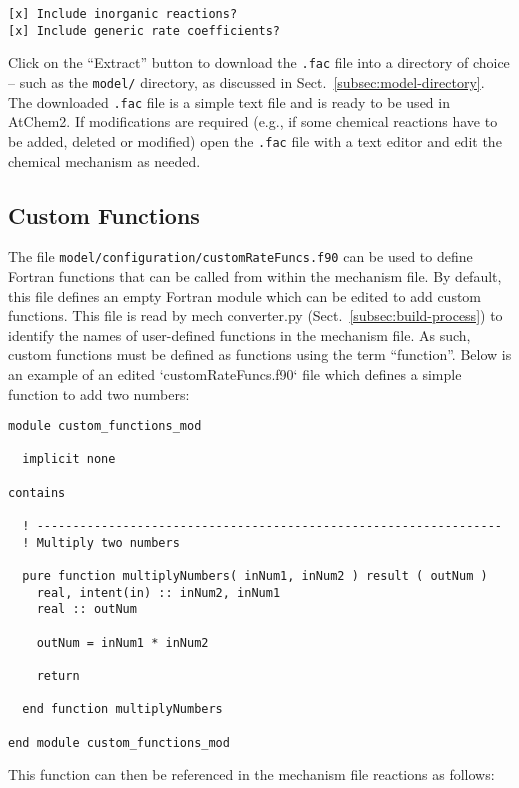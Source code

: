 \begin{verbatim}
[x] Include inorganic reactions?
[x] Include generic rate coefficients?
\end{verbatim}

Click on the ``Extract'' button to download the \texttt{.fac} file
into a directory of choice -- such as the \texttt{model/} directory,
as discussed in Sect.~\ref{subsec:model-directory}. The downloaded
\texttt{.fac} file is a simple text file and is ready to be used in
AtChem2. If modifications are required (e.g., if some chemical
reactions have to be added, deleted or modified) open the
\texttt{.fac} file with a text editor and edit the chemical mechanism
as needed.

\subsection{Custom Functions} \label{subsec:custom-functions}

The file \texttt{model/configuration/customRateFuncs.f90} can be used
to define Fortran functions that can be called from within the
mechanism file. By default, this file defines an empty Fortran module
which can be edited to add custom functions. This file is read by mech
converter.py (Sect.~\ref{subsec:build-process}) to identify the names
of user-defined functions in the mechanism file. As such, custom
functions must be defined as functions using the term
``function''. Below is an example of an edited `customRateFuncs.f90`
file which defines a simple function to add two numbers:

\begin{verbatim}
module custom_functions_mod

  implicit none

contains

  ! -----------------------------------------------------------------
  ! Multiply two numbers

  pure function multiplyNumbers( inNum1, inNum2 ) result ( outNum )
    real, intent(in) :: inNum2, inNum1
    real :: outNum

    outNum = inNum1 * inNum2

    return

  end function multiplyNumbers

end module custom_functions_mod
\end{verbatim}

This function can then be referenced in the mechanism file reactions as follows:

